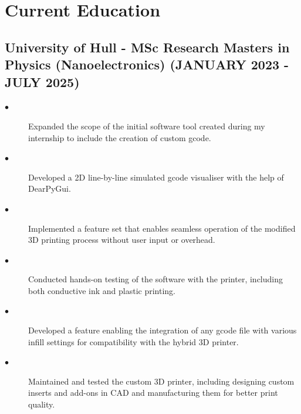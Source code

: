 \documentclass{article}
\begin{document}
\section{Current Education}
\noindent
\begin{minipage}[t]{1\textwidth}
    \subsection{University of Hull \textnormal{- MSc Research Masters in Physics (Nanoelectronics)} \footnotesize{(JANUARY 2023 - JULY 2025)}}
    \normalsize{}
    \begin{description}
        \item[$\bullet$]Expanded the scope of the initial software tool created during my internship to include the creation of custom gcode. 
        \item[$\bullet$]Developed a 2D line-by-line simulated gcode visualiser with the help of DearPyGui.
        \item[$\bullet$]Implemented a feature set that enables seamless operation of the modified 3D printing process without user input or overhead.  
        \item[$\bullet$]Conducted hands-on testing of the software with the printer, including both conductive ink and plastic printing.
        \item[$\bullet$]Developed a feature enabling the integration of any gcode file with various infill settings for compatibility with the hybrid 3D printer. 
        \item[$\bullet$]Maintained and tested the custom 3D printer, including designing custom inserts and add-ons in CAD and manufacturing them for better print quality.
    \end{description}
\end{minipage}
\end{document}
